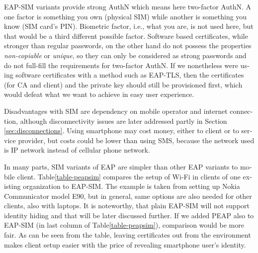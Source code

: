 \documentclass[12pt,a4paper,english]{tutthesis}
\begin{document}
\begin{otherlanguage}{english}
EAP-SIM variants provide strong AuthN which means here two-factor
AuthN. A one factor  is something you own (physical SIM) while  
another
is  something you know (SIM card's PIN). Biometric factor, i.e., what you are,
is not used here, but that would be a third different possible factor.
Software based certificates, while stronger than regular passwords,
on the other hand do not possess the properties \emph{non-copiable} or
\emph{unique}, so they can only be considered as strong passwords and 
do not full-fill the requirements for two-factor AuthN.  If we nonetheless
were using software certificates with a method such as EAP-TLS, then the
certificates (for CA and client) and the private key should still be
provisioned first, which would defeat what we want to achieve in
easy user experience.


Disadvantages with SIM are dependency on mobile operator and internet
connection, although disconnectivity issues are later addressed
partly in Section \ref{sec:disconnections}.
Using smartphone may cost money, either to client or to service
provider, but costs could be lower than using SMS, because 
the network  used is IP network instead of cellular phone network.

In many parts, SIM variants of EAP are simpler than other EAP
variants to mobile client.  Table\ref{table-peapsim} compares the setup of Wi-Fi
in clients of one existing organization to EAP-SIM. The example 
is taken from setting up Nokia Communicator model E90, but in general,
same options are also needed for other clients, also with laptops. It
is noteworthy, that plain EAP-SIM will not support identity hiding and
that will be later discussed further. If we added PEAP
also to EAP-SIM (in last column of Table\ref{table-peapsim}), comparison would be more fair.
As can be seen from the table, leaving certificates out from the environment
makes client setup easier with the price of revealing smartphone user's
identity.  




\end{otherlanguage}
\end{document}
